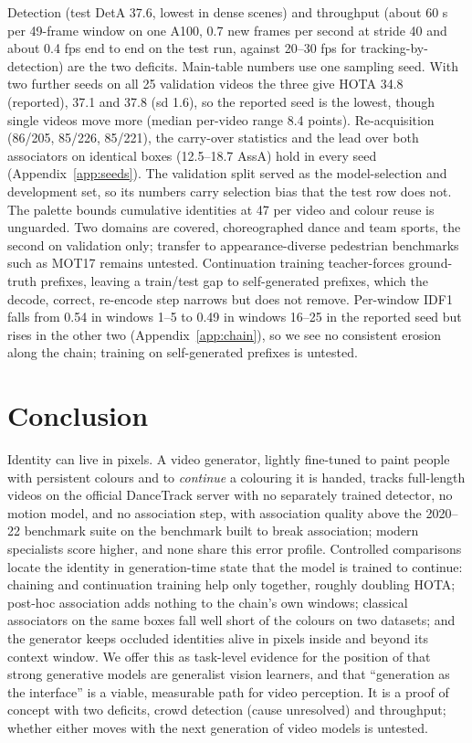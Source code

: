 \documentclass{article} %
\newcommand{\rev}[1]{{\color{blue}#1}}
\begin{document}
Detection \rev{(test DetA 37.6, lowest in dense scenes)} and throughput (about 60 s per 49-frame window on
one A100, 0.7 new frames per second at stride 40 and about \rev{0.4} fps end to end on the test
run, against 20--30 fps for tracking-by-detection) are the two deficits. \rev{Main-table
numbers use one sampling seed. With two further seeds on all 25 validation videos the three
give HOTA 34.8 (reported), 37.1 and 37.8 (sd 1.6), so the reported seed is the lowest, though single videos move
more (median per-video range 8.4 points). Re-acquisition (86/205, 85/226, 85/221), the
carry-over statistics and the lead over both associators on identical boxes (12.5--18.7
AssA) hold in every seed (Appendix~\ref{app:seeds}).} The validation split served as the model-selection and
development set, so its numbers carry selection bias that the test row does not. The
palette bounds cumulative identities at 47 per video and colour reuse is unguarded. Two
domains are covered, choreographed dance and team sports, the second on validation only;
transfer to appearance-diverse pedestrian benchmarks such as MOT17 remains untested. Continuation training teacher-forces ground-truth prefixes, leaving
a train/test gap to self-generated prefixes\rev{, which the decode, correct, re-encode step
narrows but does not remove. Per-window IDF1 falls from 0.54 in windows 1--5 to 0.49 in
windows 16--25 in the reported seed but rises in the other two (Appendix~\ref{app:chain}),
so we see no consistent erosion along the chain; training on self-generated prefixes is
untested}.

\section{Conclusion}

Identity can live in pixels. A video generator, lightly fine-tuned to paint people with
persistent colours and to \emph{continue} a colouring it is handed, tracks full-length
videos on the official DanceTrack server with no separately trained detector, no motion
model, and no association step, with association quality above the 2020--22 benchmark
suite on the benchmark built to break association; modern specialists score higher, and
none share this error profile. Controlled comparisons locate the identity in
generation-time state \rev{that the model is trained to continue: chaining and
continuation training help only together, roughly doubling HOTA;} post-hoc association adds
nothing to the chain's own windows\rev{;} classical associators
on the same boxes fall well short of the colours on two datasets\rev{;} and the generator keeps
occluded identities alive in pixels inside and beyond its context window. We offer this as
task-level evidence for the position of \citet{gabeur2026imagegen} that strong generative
models are generalist vision learners, and that ``generation as the interface'' is a
viable, measurable path for video perception. \rev{It is a proof of concept with two
deficits, crowd detection (cause unresolved) and throughput; whether either moves with the
next generation of video models is untested.}
\end{document}
